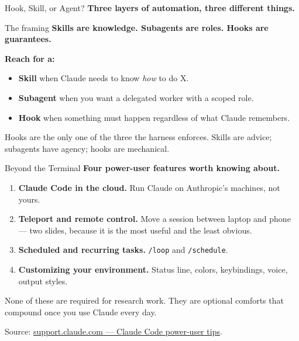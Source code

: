 \documentclass[aspectratio=169, 11pt]{beamer}
\begin{document}
\begin{frame}{Hook, Skill, or Agent?}
  \textbf{Three layers of automation, three different things.}

  \vspace{0.5em}
  \begin{block}{The framing}
    \textbf{Skills are knowledge. Subagents are roles. Hooks are guarantees.}
  \end{block}

  \vspace{0.5em}
  \textbf{Reach for a:}
  \begin{itemize}\small
    \item \textbf{Skill} when Claude needs to know \textit{how} to do X.
    \item \textbf{Subagent} when you want a delegated worker with a scoped role.
    \item \textbf{Hook} when something must happen regardless of what Claude remembers.
  \end{itemize}

  \vspace{0.5em}
  \alert{\small Hooks are the only one of the three the harness enforces. Skills are advice; subagents have agency; hooks are mechanical.}
  \vfill
  \hyperlink{backmatter}{}
\end{frame}



\begin{frame}[label=beyond]{Beyond the Terminal}
  \textbf{Four power-user features worth knowing about.}

  \vspace{0.7em}
  \begin{enumerate}
    \item \textbf{Claude Code in the cloud.} Run Claude on Anthropic's machines, not yours.
    \item \textbf{Teleport and remote control.} Move a session between laptop and phone --- two slides, because it is the most useful and the least obvious.
    \item \textbf{Scheduled and recurring tasks.} \texttt{/loop} and \texttt{/schedule}.
    \item \textbf{Customizing your environment.} Status line, colors, keybindings, voice, output styles.
  \end{enumerate}

  \vspace{0.7em}
  \alert{None of these are required for research work. They are optional comforts that compound once you use Claude every day.}

  \vspace{0.5em}
  {\small Source: \href{https://support.claude.com/en/articles/14554000-claude-code-power-user-tips}{support.claude.com --- Claude Code power-user tips}.}
\end{frame}
\end{document}
